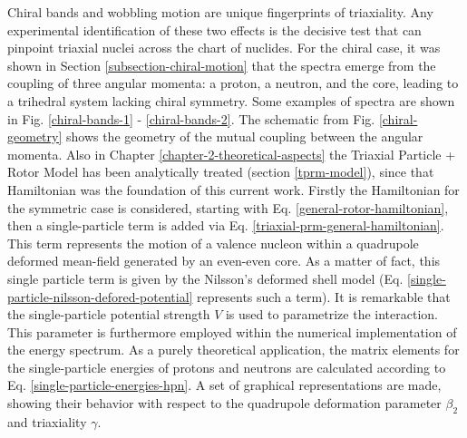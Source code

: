 Chiral bands and wobbling motion are unique fingerprints of triaxiality. Any experimental identification of these two effects is the decisive test that can pinpoint triaxial nuclei across the chart of nuclides. For the chiral case, it was shown in Section \ref{subsection-chiral-motion} that the spectra emerge from the coupling of three angular momenta: a proton, a neutron, and the core, leading to a trihedral system lacking chiral symmetry. Some examples of spectra are shown in Fig. \ref{chiral-bands-1} - \ref{chiral-bands-2}. The schematic from Fig. \ref{chiral-geometry} shows the geometry of the mutual coupling between the angular momenta. Also in Chapter \ref{chapter-2-theoretical-aspects} the Triaxial Particle + Rotor Model has been analytically treated (section \ref{tprm-model}), since that Hamiltonian was the foundation of this current work. Firstly the Hamiltonian for the symmetric case is considered, starting with Eq. \ref{general-rotor-hamiltonian}, then a single-particle term is added via Eq. \ref{triaxial-prm-general-hamiltonian}. This term represents the motion of a valence nucleon within a quadrupole deformed mean-field generated by an even-even core. As a matter of fact, this single particle term is given by the Nilsson's deformed shell model (Eq. \ref{single-particle-nilsson-defored-potential} represents such a term). It is remarkable that the single-particle potential strength $V$ is used to parametrize the interaction. This parameter is furthermore employed within the numerical implementation of the energy spectrum. As a purely theoretical application, the matrix elements for the single-particle energies of protons and neutrons are calculated according to Eq. \ref{single-particle-energies-hpn}. A set of graphical representations are made, showing their behavior with respect to the quadrupole deformation parameter $\beta_2$ and triaxiality $\gamma$. 

